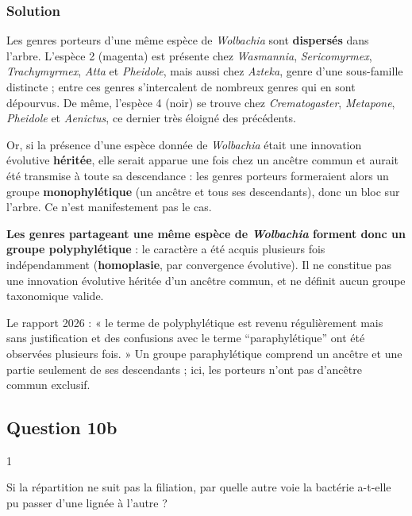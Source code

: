 \documentclass[11pt,a4paper]{article}
\begin{document}
\hypertarget{solution-63}{%
\subsubsection{Solution}\label{solution-63}}

Les genres porteurs d'une même espèce de \emph{Wolbachia} sont \textbf{dispersés} dans l'arbre. L'espèce 2 (magenta) est présente chez \emph{Wasmannia}, \emph{Sericomyrmex}, \emph{Trachymyrmex}, \emph{Atta} et \emph{Pheidole}, mais aussi chez \emph{Azteka}, genre d'une sous-famille distincte ; entre ces genres s'intercalent de nombreux genres qui en sont dépourvus. De même, l'espèce 4 (noir) se trouve chez \emph{Crematogaster}, \emph{Metapone}, \emph{Pheidole} et \emph{Aenictus}, ce dernier très éloigné des précédents.

Or, si la présence d'une espèce donnée de \emph{Wolbachia} était une innovation évolutive \textbf{héritée}, elle serait apparue une fois chez un ancêtre commun et aurait été transmise à toute sa descendance : les genres porteurs formeraient alors un groupe \textbf{monophylétique} (un ancêtre et tous ses descendants), donc un bloc sur l'arbre. Ce n'est manifestement pas le cas.

\textbf{Les genres partageant une même espèce de \emph{Wolbachia} forment donc un groupe polyphylétique} : le caractère a été acquis plusieurs fois indépendamment (\textbf{homoplasie}, par convergence évolutive). Il ne constitue pas une innovation évolutive héritée d'un ancêtre commun, et ne définit aucun groupe taxonomique valide.

\begin{jury}

Le rapport 2026 : « le terme de polyphylétique est revenu régulièrement mais sans justification et des confusions avec le terme ``paraphylétique'' ont été observées plusieurs fois. » Un groupe paraphylétique comprend un ancêtre et une partie seulement de ses descendants ; ici, les porteurs n'ont pas d'ancêtre commun exclusif.

\end{jury}

\hypertarget{question-10b}{%
\subsection{Question 10b}\label{question-10b}}

\begin{indication}{1}

Si la répartition ne suit pas la filiation, par quelle autre voie la bactérie a-t-elle pu passer d'une lignée à l'autre ?

\end{indication}
\end{document}
